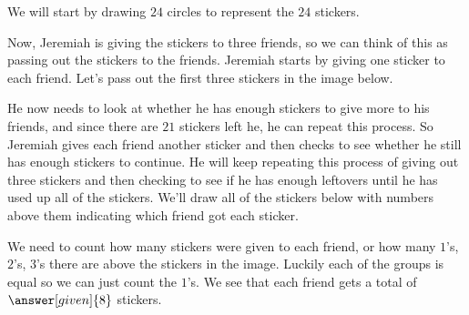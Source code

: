 \documentclass{ximera}
\begin{document}
\begin{example}
We will start by drawing $24$ circles to represent the $24$ stickers.

\begin{image}
\end{image}

Now, Jeremiah is giving the stickers to three friends, so we can think of this as passing out the stickers to the friends. Jeremiah starts by giving one sticker to each friend.  Let's pass out the first three stickers in the image below.

\begin{image}
\end{image}

He now needs to look at whether he has enough stickers to give more to his friends, and since there are $21$ stickers left he, he can repeat this process. So Jeremiah gives each friend another sticker and then checks to see whether he still has enough stickers to continue. He will keep repeating this process of giving out three stickers and then checking to see if he has enough leftovers until he has used up all of the stickers. We'll draw all of the stickers below with numbers above them indicating which friend got each sticker.

\begin{image}
\end{image}

We need to count how many stickers were given to each friend, or how many $1$'s, $2$'s, $3$'s there are above the stickers in the image. Luckily each of the groups is equal so we can just count the $1$'s. We see that each friend gets a total of $\answer[given]{8}$ stickers.


\end{example}
\end{document}
